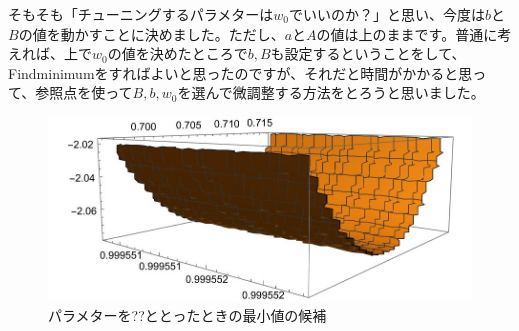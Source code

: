 \documentclass[unicode,a4paper,11pt]{ltjsarticle}
\theoremstyle{definition}
\begin{document}
そもそも「チューニングするパラメターは$w_{0}$でいいのか？」と思い、今度は$b$と$B$の値を動かすことに決めました。ただし、$a$と$A$の値は上のままです。普通に考えれば、上で$w_{0}$の値を決めたところで$b,B$も設定するということをして、Findminimumをすればよいと思ったのですが、それだと時間がかかると思って、参照点を使って$B,b,w_{0}$を選んで微調整する方法をとろうと思いました。







\begin{figure}
  \centering
  \includegraphics[width=0.8\linewidth]{fig/20240318.jpg}
  \caption{パラメターを??ととったときの最小値の候補}
  \label{fig:20240318}
\end{figure}















\clearpage



\nocite{Abe:2006xp}
\nocite{Abe:2007yb}
\nocite{Abe:2012ya}
\end{document}
